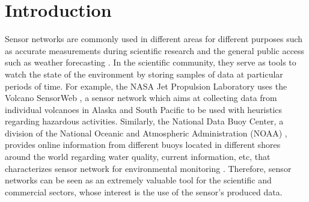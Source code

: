 

\chapter{Introduction}

Sensor networks are commonly used in different areas for different purposes
such as accurate measurements during scientific research \cite{sn-intro01} and
the general public access such as weather forecasting \cite{sn-intro02}. In the
scientific community, they serve as tools to watch the state of the environment
by storing samples of data at particular periods of time. For example, the
NASA Jet Propulsion Laboratory uses the Volcano SensorWeb \cite{sn-ex02}, a
sensor network which aims at collecting data from individual volcanoes in
Alaska and South Pacific to be used with heuristics regarding hazardous
activities. Similarly, the National Data Buoy Center, a division of the
National Oceanic and Atmospheric Administration (NOAA) \cite{sn-ex03},
provides online information from different buoys located in different shores around
the world regarding water quality, current information, etc, that
characterizes sensor network for environmental monitoring \cite{sn-ex01}.
Therefore, sensor networks can be seen as an extremely valuable tool
for the scientific and commercial sectors, whose interest is the use of
the sensor's produced data.

